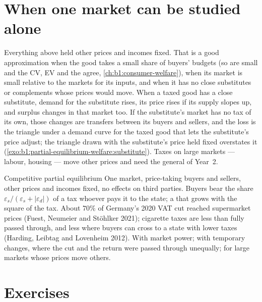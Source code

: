 \section{When one market can be studied alone}\label{sec:b1:partial-equilibrium-welfare:alone}

Everything above held other prices and incomes fixed. That is a good
approximation when the good takes a small share of buyers' budgets (so
 are small and the CV, EV and the  agree,
\cref{ch:b1:consumer-welfare}), when its market is small relative to the
markets for its inputs, and when it has no close substitutes or
complements whose prices would move. When a taxed good has a close
substitute, demand for the substitute rises, its price rises if its supply
slopes up, and surplus changes in that market too. If the substitute's
market has no tax of its own, those changes are transfers between its
buyers and sellers, and the loss is the triangle under a demand curve for
the taxed good that lets the substitute's price adjust; the triangle drawn
with the substitute's price held fixed overstates it
(\cref{exo:b1:partial-equilibrium-welfare:substitute}). Taxes on large
markets --- labour, housing --- move other prices and need the general
 of Year~2.

\begin{model}{Competitive partial equilibrium}
\assumes One market, price-taking buyers and sellers, other prices and
incomes fixed, no effects on third parties.
\predicts Buyers bear the share $\varepsilon_s/(\varepsilon_s + |\varepsilon_d|)$ of a tax whoever pays it to
the state; a  that grows with the square of the tax.
\tested About $70\%$ of Germany's 2020 VAT cut reached supermarket prices
(Fuest, Neumeier and Stöhlker 2021); %
cigarette taxes are less than fully passed through, and less where buyers
can cross to a state with lower taxes (Harding, Leibtag and Lovenheim
2012). %
\breaks With market power; with temporary changes, where the cut and the
return were passed through unequally; for large markets whose prices move
others.
\end{model}

\section*{Exercises}\label{sec:b1:partial-equilibrium-welfare:exercises}

